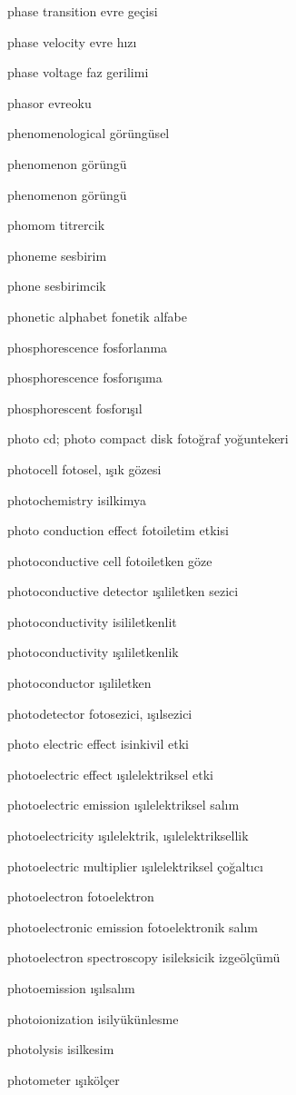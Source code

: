 \documentclass[12pt,fleqn]{article}\usepackage{../../common}
\begin{document}
phase transition evre geçisi

phase velocity evre hızı

phase voltage faz gerilimi

phasor evreoku

phenomenological görüngüsel

phenomenon görüngü

phenomenon görüngü

phomom titrercik

phoneme sesbirim

phone sesbirimcik

phonetic alphabet fonetik alfabe

phosphorescence fosforlanma

phosphorescence fosforışıma

phosphorescent fosforışıl

photo cd; photo compact disk fotoğraf yoğuntekeri

photocell fotosel, ışık gözesi

photochemistry isilkimya

photo conduction effect fotoiletim etkisi

photoconductive cell fotoiletken göze

photoconductive detector ışıliletken sezici

photoconductivity isililetkenlit

photoconductivity ışıliletkenlik

photoconductor ışıliletken

photodetector fotosezici, ışılsezici

photo electric effect isinkivil etki

photoelectric effect ışılelektriksel etki

photoelectric emission ışılelektriksel salım

photoelectricity ışılelektrik, ışılelektriksellik

photoelectric multiplier ışılelektriksel çoğaltıcı

photoelectron fotoelektron

photoelectronic emission fotoelektronik salım

photoelectron spectroscopy isileksicik izgeölçümü

photoemission ışılsalım

photoionization isilyükünlesme

photolysis isilkesim

photometer ışıkölçer
\end{document}
